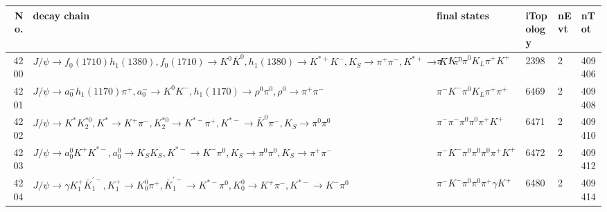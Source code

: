\begin{table}[htbp] 
\begin{center}
\begin{small}
\begin{tabular}{rlllll}\hline\hline
 No. & decay chain & final states &  iTopology & nEvt & nTot \\\hline
4200&$J/\psi       \rightarrow f_{0}(1710)    h_{1}(1380)    , f_{0}(1710)     \rightarrow K^{0}          \bar{K}^{0}   , h_{1}(1380)     \rightarrow K^{*+}         K^{-}          , K_{S}           \rightarrow \pi^{+}        \pi^{-}        , K^{*+}          \rightarrow K^{+}          \pi^{0}        $&$\pi^{-}        K^{-}          \pi^{0}        K_{L}          \pi^{+}        K^{+}          $& 2398&    2&409406\\
4201&$J/\psi       \rightarrow a_{0}^{-}      h_{1}(1170)    \pi^{+}        , a_{0}^{-}       \rightarrow K^{0}          K^{-}          , h_{1}(1170)     \rightarrow \rho^{0}      \pi^{0}        , \rho^{0}       \rightarrow \pi^{+}        \pi^{-}        $&$\pi^{-}        K^{-}          \pi^{0}        K_{L}          \pi^{+}        \pi^{+}        $& 6469&    2&409408\\
4202&$J/\psi       \rightarrow K^{*}          K_2^{*0}       , K^{*}           \rightarrow K^{+}          \pi^{-}        , K_2^{*0}        \rightarrow K^{*-}         \pi^{+}        , K^{*-}          \rightarrow \bar{K}^{0}   \pi^{-}        , K_{S}           \rightarrow \pi^{0}        \pi^{0}        $&$\pi^{-}        \pi^{-}        \pi^{0}        \pi^{0}        \pi^{+}        K^{+}          $& 6471&    2&409410\\
4203&$J/\psi       \rightarrow a_{0}^{0}      K^{+}          K^{*-}         , a_{0}^{0}       \rightarrow K_{S}          K_{S}          , K^{*-}          \rightarrow K^{-}          \pi^{0}        , K_{S}           \rightarrow \pi^{0}        \pi^{0}        , K_{S}           \rightarrow \pi^{+}        \pi^{-}        $&$\pi^{-}        K^{-}          \pi^{0}        \pi^{0}        \pi^{0}        \pi^{+}        K^{+}          $& 6472&    2&409412\\
4204&$J/\psi       \rightarrow \gamma       K_1^{+}        \bar{K}_1^{'-}, K_1^{+}         \rightarrow K_0^{0}        \pi^{+}        , \bar{K}_1^{'-} \rightarrow K^{*-}         \pi^{0}        , K_0^{0}         \rightarrow K^{+}          \pi^{-}        , K^{*-}          \rightarrow K^{-}          \pi^{0}        $&$\pi^{-}        K^{-}          \pi^{0}        \pi^{0}        \pi^{+}        \gamma       K^{+}          $& 6480&    2&409414\\

\end{tabular}
\end{small}
\end{center}
\end{table}
